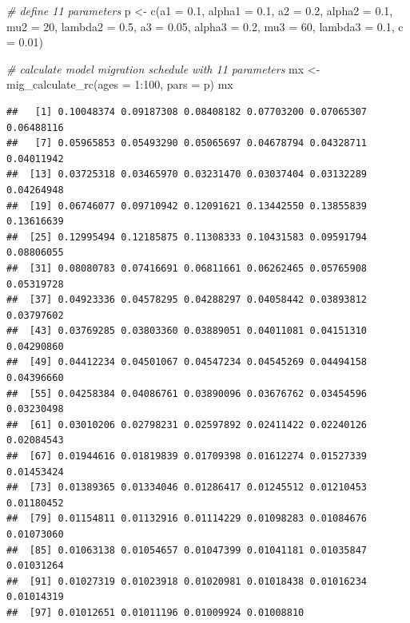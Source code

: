 \documentclass[
]{book}
\newenvironment{Shaded}{\begin{snugshade}}{\end{snugshade}}
\newcommand{\AttributeTok}[1]{\textcolor[rgb]{0.77,0.63,0.00}{#1}}
\newcommand{\CommentTok}[1]{\textcolor[rgb]{0.56,0.35,0.01}{\textit{#1}}}
\newcommand{\DecValTok}[1]{\textcolor[rgb]{0.00,0.00,0.81}{#1}}
\newcommand{\FloatTok}[1]{\textcolor[rgb]{0.00,0.00,0.81}{#1}}
\newcommand{\FunctionTok}[1]{\textcolor[rgb]{0.00,0.00,0.00}{#1}}
\newcommand{\NormalTok}[1]{#1}
\newcommand{\OtherTok}[1]{\textcolor[rgb]{0.56,0.35,0.01}{#1}}
\newcommand{\SpecialCharTok}[1]{\textcolor[rgb]{0.00,0.00,0.00}{#1}}
\begin{document}
\begin{Shaded}
\begin{Highlighting}[]
\CommentTok{\# define 11 parameters}
\NormalTok{p }\OtherTok{\textless{}{-}} \FunctionTok{c}\NormalTok{(}\AttributeTok{a1 =} \FloatTok{0.1}\NormalTok{, }\AttributeTok{alpha1 =} \FloatTok{0.1}\NormalTok{, }
       \AttributeTok{a2 =} \FloatTok{0.2}\NormalTok{, }\AttributeTok{alpha2 =} \FloatTok{0.1}\NormalTok{, }\AttributeTok{mu2 =} \DecValTok{20}\NormalTok{, }\AttributeTok{lambda2 =} \FloatTok{0.5}\NormalTok{, }
       \AttributeTok{a3 =} \FloatTok{0.05}\NormalTok{, }\AttributeTok{alpha3 =} \FloatTok{0.2}\NormalTok{, }\AttributeTok{mu3 =} \DecValTok{60}\NormalTok{, }\AttributeTok{lambda3 =} \FloatTok{0.1}\NormalTok{, }
       \AttributeTok{c =} \FloatTok{0.01}\NormalTok{)}

\CommentTok{\# calculate model migration schedule with 11 parameters}
\NormalTok{mx }\OtherTok{\textless{}{-}} \FunctionTok{mig\_calculate\_rc}\NormalTok{(}\AttributeTok{ages =} \DecValTok{1}\SpecialCharTok{:}\DecValTok{100}\NormalTok{, }\AttributeTok{pars =}\NormalTok{ p)}
\NormalTok{mx}
\end{Highlighting}
\end{Shaded}

\begin{verbatim}
##   [1] 0.10048374 0.09187308 0.08408182 0.07703200 0.07065307 0.06488116
##   [7] 0.05965853 0.05493290 0.05065697 0.04678794 0.04328711 0.04011942
##  [13] 0.03725318 0.03465970 0.03231470 0.03037404 0.03132289 0.04264948
##  [19] 0.06746077 0.09710942 0.12091621 0.13442550 0.13855839 0.13616639
##  [25] 0.12995494 0.12185875 0.11308333 0.10431583 0.09591794 0.08806055
##  [31] 0.08080783 0.07416691 0.06811661 0.06262465 0.05765908 0.05319728
##  [37] 0.04923336 0.04578295 0.04288297 0.04058442 0.03893812 0.03797602
##  [43] 0.03769285 0.03803360 0.03889051 0.04011081 0.04151310 0.04290860
##  [49] 0.04412234 0.04501067 0.04547234 0.04545269 0.04494158 0.04396660
##  [55] 0.04258384 0.04086761 0.03890096 0.03676762 0.03454596 0.03230498
##  [61] 0.03010206 0.02798231 0.02597892 0.02411422 0.02240126 0.02084543
##  [67] 0.01944616 0.01819839 0.01709398 0.01612274 0.01527339 0.01453424
##  [73] 0.01389365 0.01334046 0.01286417 0.01245512 0.01210453 0.01180452
##  [79] 0.01154811 0.01132916 0.01114229 0.01098283 0.01084676 0.01073060
##  [85] 0.01063138 0.01054657 0.01047399 0.01041181 0.01035847 0.01031264
##  [91] 0.01027319 0.01023918 0.01020981 0.01018438 0.01016234 0.01014319
##  [97] 0.01012651 0.01011196 0.01009924 0.01008810
\end{verbatim}
\end{document}
